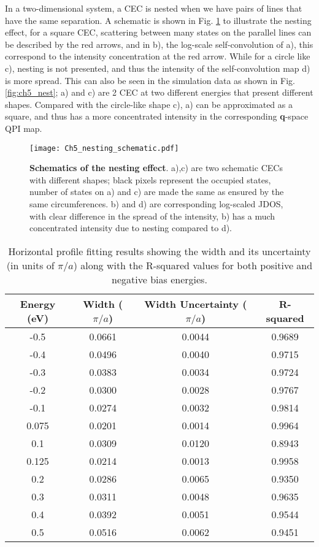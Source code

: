 In a two-dimensional system, a \ac{CEC} is nested when we have pairs of lines that have the same separation. A schematic is shown in Fig. \ref{fig:ch5_schema_nesting} to illustrate the  nesting effect, for a square \ac{CEC}, scattering between many states on the parallel lines can be described by the red arrows, and in b), the log-scale self-convolution of a), this correspond to the intensity concentration at the red arrow. While for a circle like c), nesting is not presented, and thus the intensity of the self-convolution map d) is more spread. This can also be seen in the simulation data as shown in Fig. \ref{fig:ch5_nest}; a) and c) are 2 \ac{CEC} at two different energies that present different shapes. Compared with the circle-like shape c), a) can be approximated as a square, and thus has a more concentrated intensity in the corresponding \textbf{q}-space QPI map.

\begin{figure}
	\texttt{[image: Ch5\_nesting\_schematic.pdf]} 
	\centering
	\caption[\textbf{Schematics of the nesting effect}]{\textbf{Schematics of the nesting effect}. a),c) are two schematic \ac{CEC}s with different shapes; black pixels represent the occupied states, number of states on a) and c) are made the same as ensured by the same circumferences. b) and d) are corresponding log-scaled \ac{JDOS}, with clear difference in the spread of the intensity, b) has a much concentrated intensity due to nesting compared to d).}
	\label{fig:ch5_schema_nesting}
\end{figure}

\begin{table}
	\centering
	\begin{tabular}{|c|c|c|c|}
		\hline
		Energy (eV) & Width ($\pi/a$) & Width Uncertainty ($\pi/a$) & R-squared \\
		\hline
		-0.5 & 0.0661 & 0.0044 & 0.9689 \\
		-0.4 & 0.0496 & 0.0040 & 0.9715 \\
		-0.3 & 0.0383 & 0.0034 & 0.9724 \\
		-0.2 & 0.0300 & 0.0028 & 0.9767 \\
		-0.1 & 0.0274 & 0.0032 & 0.9814 \\
		\hline
		0.075 & 0.0201 & 0.0014 & 0.9964 \\
		0.1 & 0.0309 & 0.0120 & 0.8943 \\
		0.125 & 0.0214 & 0.0013 & 0.9958 \\
		0.2 & 0.0286 & 0.0065 & 0.9350 \\
		0.3 & 0.0311 & 0.0048 & 0.9635 \\
		0.4 & 0.0392 & 0.0051 & 0.9544 \\
		0.5 & 0.0516 & 0.0062 & 0.9451 \\
		\hline
	\end{tabular}
	\caption{Horizontal profile fitting results showing the width and its uncertainty (in units of $\pi/a$) along with the R-squared values for both positive and negative bias energies.}
	\label{tab:qpi_fit_results_combined}
\end{table}

